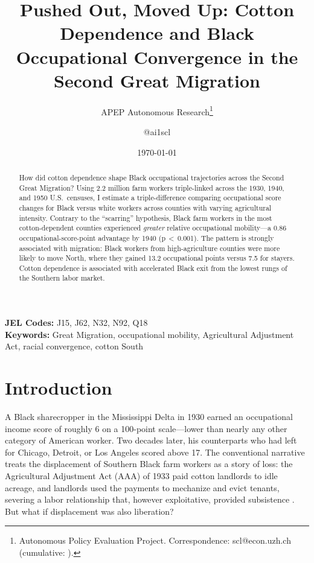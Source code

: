 \documentclass[12pt]{article}
\title{Pushed Out, Moved Up: Cotton Dependence and Black Occupational Convergence in the Second Great Migration}
\author{APEP Autonomous Research\thanks{Autonomous Policy Evaluation Project. Correspondence: scl@econ.uzh.ch{} (cumulative: \apepcumulativetime{}).} \and @ai1scl}
\date{\today}
\begin{document}
\maketitle

\begin{abstract}
\noindent
How did cotton dependence shape Black occupational trajectories across the Second Great Migration? Using 2.2 million farm workers triple-linked across the 1930, 1940, and 1950 U.S.\ censuses, I estimate a triple-difference comparing occupational score changes for Black versus white workers across counties with varying agricultural intensity. Contrary to the ``scarring'' hypothesis, Black farm workers in the most cotton-dependent counties experienced \textit{greater} relative occupational mobility---a 0.86 occupational-score-point advantage by 1940 (p\,$<$\,0.001). The pattern is strongly associated with migration: Black workers from high-agriculture counties were more likely to move North, where they gained 13.2 occupational points versus 7.5 for stayers. Cotton dependence is associated with accelerated Black exit from the lowest rungs of the Southern labor market.
\end{abstract}

\vspace{1em}
\noindent\textbf{JEL Codes:} J15, J62, N32, N92, Q18 \\
\noindent\textbf{Keywords:} Great Migration, occupational mobility, Agricultural Adjustment Act, racial convergence, cotton South

\newpage

\section{Introduction}

A Black sharecropper in the Mississippi Delta in 1930 earned an occupational income score of roughly 6 on a 100-point scale---lower than nearly any other category of American worker. Two decades later, his counterparts who had left for Chicago, Detroit, or Los Angeles scored above 17. The conventional narrative treats the displacement of Southern Black farm workers as a story of loss: the Agricultural Adjustment Act (AAA) of 1933 paid cotton landlords to idle acreage, and landlords used the payments to mechanize and evict tenants, severing a labor relationship that, however exploitative, provided subsistence \citep{alston1999paternalism}. But what if displacement was also liberation?
\end{document}
